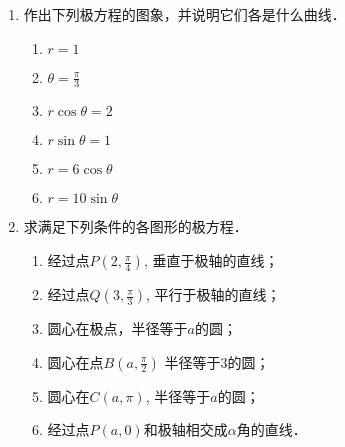 \begin{enumerate}
    \item 作出下列极方程的图象，并说明它们各是什么曲线．
\begin{multicols}{2}
    \begin{enumerate}
        \item $r=1$
        \item $\theta=\frac{\pi}{3}$
        \item $r\cos\theta =2$
        \item $r\sin\theta =1$
        \item $r=6\cos\theta$
        \item $r=10\sin\theta$
    \end{enumerate}
\end{multicols}

    \item 求满足下列条件的各图形的极方程．
\begin{enumerate}
 \item 经过点$P\left(2,\frac{\pi}{4}\right)$, 
    垂直于极轴的直线；
    \item 经过点$Q\left(3,\frac{\pi}{3}\right)$, 
    平行于极轴的直线；
    \item 圆心在极点，半径等于$a$的圆；
    \item 圆心在点$B\left(a,\frac{\pi}{2}\right)$
    半径等于3的圆；
    \item 圆心在$C(a,\pi)$, 半径等于$a$的圆；
    \item 经过点$P(a,0)$和极轴相交成$\alpha$角的直线．  
\end{enumerate}


\end{enumerate}
